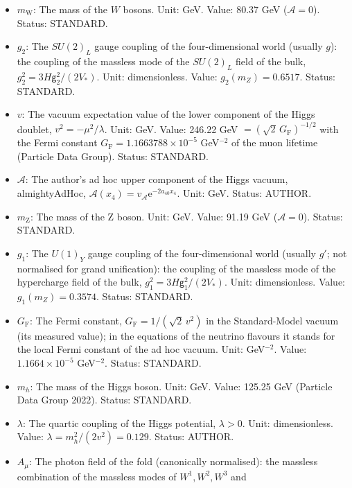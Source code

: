 \documentclass[
  10pt,
]{article}
\providecommand{\tightlist}{%
  \setlength{\itemsep}{0pt}\setlength{\parskip}{0pt}}
\begin{document}
\begin{itemize}
\tightlist
\item
  \(m_{\mathrm{W}}\): The mass of the \(W\) bosons. Unit: GeV. Value:
  80.37 GeV (\(\mathcal{A} = 0\)). Status: STANDARD.
\item
  \(g_2\): The \(SU(2)_L\) gauge coupling of the four-dimensional world
  (usually \(g\)): the coupling of the massless mode of the \(SU(2)_L\)
  field of the bulk, \(g_2^2 = 3H\mathsf{g}_2^2/(2V_*)\). Unit:
  dimensionless. Value: \(g_2(m_Z) = 0.6517\). Status: STANDARD.
\item
  \(v\): The vacuum expectation value of the lower component of the
  Higgs doublet, \(v^2 = -\mu^2/\lambda\). Unit: GeV. Value: 246.22 GeV
  \(= (\sqrt2\,G_{\mathrm{F}})^{-1/2}\) with the Fermi constant
  \(G_{\mathrm{F}} = 1.1663788\times10^{-5}\) GeV\(^{-2}\) of the muon
  lifetime (Particle Data Group). Status: STANDARD.
\item
  \(\mathcal{A}\): The author's ad hoc upper component of the Higgs
  vacuum, almightyAdHoc,
  \(\mathcal{A}(x_4) = v_{\mathcal{A}}\mathrm{e}^{-2a_{40}x_4}\). Unit:
  GeV. Status: AUTHOR.
\item
  \(m_{\mathrm{Z}}\): The mass of the Z boson. Unit: GeV. Value: 91.19
  GeV (\(\mathcal{A} = 0\)). Status: STANDARD.
\item
  \(g_1\): The \(U(1)_Y\) gauge coupling of the four-dimensional world
  (usually \(g'\); not normalised for grand unification): the coupling
  of the massless mode of the hypercharge field of the bulk,
  \(g_1^2 = 3H\mathsf{g}_1^2/(2V_*)\). Unit: dimensionless. Value:
  \(g_1(m_Z) = 0.3574\). Status: STANDARD.
\item
  \(G_{\mathrm{F}}\): The Fermi constant,
  \(G_{\mathrm{F}} = 1/(\sqrt2\,v^2)\) in the Standard-Model vacuum (its
  measured value); in the equations of the neutrino flavours it stands
  for the local Fermi constant of the ad hoc vacuum. Unit: GeV\(^{-2}\).
  Value: \(1.1664\times10^{-5}\) GeV\(^{-2}\). Status: STANDARD.
\item
  \(m_h\): The mass of the Higgs boson. Unit: GeV. Value: 125.25 GeV
  (Particle Data Group 2022). Status: STANDARD.
\item
  \(\lambda\): The quartic coupling of the Higgs potential,
  \(\lambda > 0\). Unit: dimensionless. Value:
  \(\lambda = m_h^2/(2v^2) = 0.129\). Status: AUTHOR.
\item
  \(A_\mu\): The photon field of the fold (canonically normalised): the
  massless combination of the massless modes of \(W^1, W^2, W^3\) and

\end{itemize}
\end{document}
